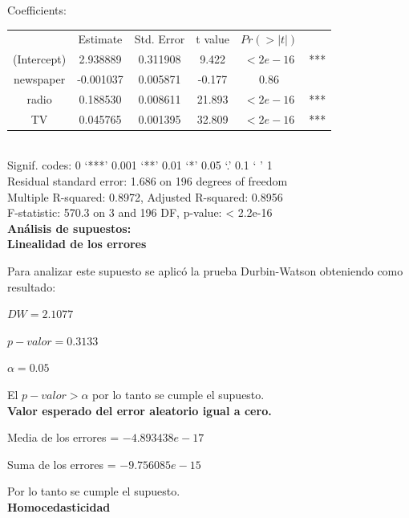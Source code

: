 \documentclass[12pt,a4paper]{article}
\begin{document}
	Coefficients:\\
	
	\begin{tabular}{cccccc}
		&     Estimate & Std. Error&     t value&   $Pr(>|t|)$&\\
		(Intercept) & 2.938889 &  0.311908 &  9.422  & $<2e-16$ &***\\
		newspaper   &-0.001037 &  0.005871 & -0.177  &   0.86 &\\ 
		radio       & 0.188530 &  0.008611 & 21.893  & $<2e-16$ &***\\
		TV          & 0.045765 &  0.001395 & 32.809  &$<2e-16$ &***\\
	\end{tabular}\\
	
	Signif. codes:  0 ‘***’ 0.001 ‘**’ 0.01 ‘*’ 0.05 ‘.’ 0.1 ‘ ’ 1\\
	
	Residual standard error: 1.686 on 196 degrees of freedom\\
	
	Multiple R-squared:  0.8972,	Adjusted R-squared:  0.8956\\
	 
	F-statistic: 570.3 on 3 and 196 DF,  p-value: < 2.2e-16\\
	
	{\bf Análisis de supuestos:}\\
	
	\textbf{Linealidad de los errores}
	
	Para analizar este supuesto se aplicó la prueba  Durbin-Watson obteniendo como resultado:
	
	\begin{center}
		$DW = 2.1077$
		
		$p-valor = 0.3133$
		
		$\alpha = 0.05$
	\end{center}

	El $p-valor > \alpha$ por lo tanto se cumple el supuesto.\\
	
	\textbf{Valor esperado del error aleatorio igual a cero.}
	
	Media de los errores = $-4.893438e-17$
	
	Suma de los errores = $-9.756085e-15$
	
	Por lo tanto se cumple el supuesto.
	\\
	
	\textbf{Homocedasticidad}
	
\end{document}
